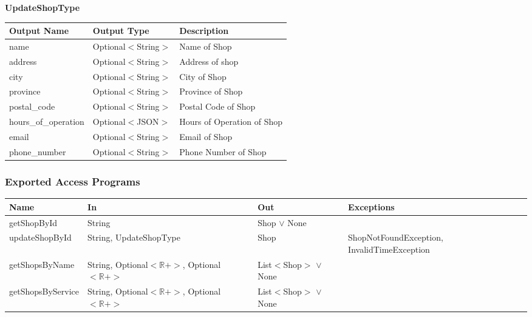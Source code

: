 \documentclass[12pt, titlepage]{article}
\begin{document}
\textbf{UpdateShopType}

\begin{table}[H]
	\begin{tabular}{|p{}|p{}|p{}|}
		\hline
		\textbf{Output Name} & \textbf{Output Type} & \textbf{Description}       \\
		\hline
		name                 & Optional$<$String$>$ & Name of Shop               \\
		\hline
		address              & Optional$<$String$>$ & Address of shop            \\
		\hline
		city                 & Optional$<$String$>$ & City of Shop               \\
		\hline
		province             & Optional$<$String$>$ & Province of Shop           \\
		\hline
		postal\_code         & Optional$<$String$>$ & Postal Code of Shop        \\
		\hline
		hours\_of\_operation & Optional$<$JSON$>$   & Hours of Operation of Shop \\
		\hline
		email                & Optional$<$String$>$ & Email of Shop              \\
		\hline
		phone\_number        & Optional$<$String$>$ & Phone Number of Shop       \\
		\hline
	\end{tabular}
\end{table}

\subsubsection{Exported Access Programs}

\begin{center}
	\begin{adjustbox}{width=\textwidth}
		\begin{tabular}{llll}
			\hline
			\textbf{Name}     & \textbf{In}                                              & \textbf{Out}               & \textbf{Exceptions}                         \\
			\hline
			getShopById       & String                                                   & Shop $\lor$ None           & ~                                           \\
			updateShopById    & String, UpdateShopType                                   & Shop                       & ShopNotFoundException, InvalidTimeException \\
			getShopsByName    & String, Optional$<\mathbb{R}+>$, Optional$<\mathbb{R}+>$ & List$<$Shop$>$ $\lor$ None & ~                                           \\
			getShopsByService & String, Optional$<\mathbb{R}+>$, Optional$<\mathbb{R}+>$ & List$<$Shop$>$ $\lor$ None & ~                                           \\
			\hline
		\end{tabular}
	\end{adjustbox}
\end{center}
\end{document}
